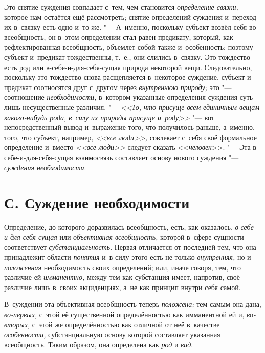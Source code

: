 Это снятие суждения совпадает с~тем, чем становится {\em определение связки,}
которое нам остаётся ещё рассмотреть; снятие определений суждения и~переход их
в~связку есть одно и~то же. "--- А~именно, поскольку субъект возвёл себя во
всеобщность, он в~этом определении стал равен предикату, который, как
рефлектированная всеобщность, объемлет собой также и~особенность; поэтому
субъект и~предикат тождественны, т.~е., они слились в~связку. Это тождество
есть род или в-себе-и-для-себя-сущая природа некоторой вещи. Следовательно,
поскольку это тождество снова расщепляется в~некоторое суждение, субъект и
предикат соотносятся друг с~другом через {\em внутреннюю природу;} это "---
соотношение {\em необходимости,} в~котором указанные определения суждения суть
лишь несущественные различия. "--- {\em <<То, что присуще всем единичным вещам
какого-нибудь рода, в~силу их природы присуще и~роду>>} "--- вот
непосредственный вывод и~выражение того, что получилось раньше, а~именно, того,
что субъект, например, {\em <<все люди>>,} совлекает с~себя своё формальное
определение и~вместо {\em <<все люди>>} следует сказать <<{\em человек}>>. "---
Эта в-себе-и-для-себя-сущая взаимосвязь составляет основу нового суждения "---
{\em суждения необходимости}.

\section[С. Суждение необходимости]{С. Суждение необходимости}

Определение, до которого доразвилась всеобщность, есть, как
оказалось, {\em в-себе-и-для-себя-сущая} или {\em объективная
всеобщность,} которой в~сфере сущности соответствует {\em субстанциальность}.
Первая отличается от последней тем, что она принадлежит
области {\em понятия} и~в силу этого есть не только {\em внутренняя,} но и
{\em положенная} необходимость своих определений; или, иначе говоря, тем, что
различие ей {\em имманентно,}
между тем как субстанция имеет, напротив, своё различие лишь
в~своих акциденциях, а~не как принцип внутри себя самой.

В~суждении эта объективная всеобщность теперь {\em положена;} тем самым
она дана, {\em во-первых,} с~этой её существенной определённостью как
имманентной ей и, {\em во-вторых,} с~этой
же определённостью как отличной от неё в~качестве {\em особенности,}
субстанциальную основу которой составляет указанная
всеобщность. Таким образом, она определена как {\em род} и {\em вид}.



